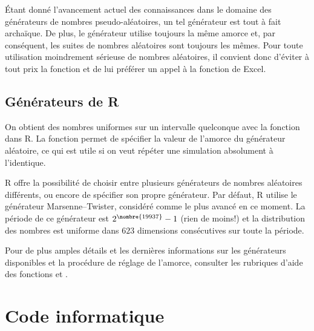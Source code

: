 Étant donné l'avancement actuel des connaissances dans le domaine des
générateurs de nombres pseudo-aléatoires, un tel générateur est tout à
fait archaïque. De plus, le générateur utilise toujours la même amorce
et, par conséquent, les suites de nombres aléatoires sont toujours les
mêmes. Pour toute utilisation moindrement sérieuse de nombres
aléatoires, il convient donc d'éviter à tout prix la fonction
 et de lui préférer un appel à la fonction 
de Excel.


\subsection{Générateurs de R}

On obtient des nombres uniformes sur un intervalle quelconque avec la
fonction  dans R. La fonction  permet de
spécifier la valeur de l'amorce du générateur aléatoire, ce qui est
utile si on veut répéter une simulation absolument à l'identique.

R offre la possibilité de choisir entre plusieurs générateurs de
nombres aléatoires différents, ou encore de spécifier son propre
générateur. Par défaut, R utilise le générateur Marsenne--Twister,
considéré comme le plus avancé en ce moment. La période de ce
générateur est $2^{\nombre{19937}} - 1$ (rien de moins!) et la
distribution des nombres est uniforme dans $623$ dimensions consécutives
sur toute la période.

Pour de plus amples détails et les dernières informations sur les
générateurs disponibles et la procédure de réglage de l'amorce,
consulter les rubriques d'aide des fonctions  et
.


\section{Code informatique}
\label{sec:generation:code}



\vfill



